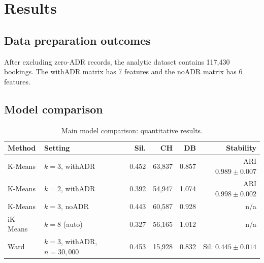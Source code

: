 \documentclass[11pt,a4paper]{article}
\begin{document}
\section{Results}

\subsection{Data preparation outcomes}
After excluding zero-ADR records, the analytic dataset contains 117,430 bookings. The withADR matrix has 7 features and the noADR matrix has 6 features. 

\subsection{Model comparison}
\begin{table}[H]
\centering
\caption{Main model comparison: quantitative results.}
\label{tab:model-comparison-metrics}
\small
\begin{tabular}{llrrrr}
\toprule
\textbf{Method} & \textbf{Setting} & \textbf{Sil.} & \textbf{CH} & \textbf{DB} & \textbf{Stability} \\
\midrule
K-Means & $k=3$, withADR & 0.452 & 63,837 & 0.857 & ARI $0.989 \pm 0.007$ \\
K-Means & $k=2$, withADR & 0.392 & 54,947 & 1.074 & ARI $0.998 \pm 0.002$ \\
K-Means & $k=3$, noADR & 0.443 & 60,587 & 0.928 & n/a \\
iK-Means & $k=8$ (auto) & 0.327 & 56,165 & 1.012 & n/a \\
Ward & $k=3$, withADR, $n=30{,}000$ & 0.453 & 15,928 & 0.832 & Sil. $0.445 \pm 0.014$ \\
\bottomrule
\end{tabular}
\end{table}
\end{document}
